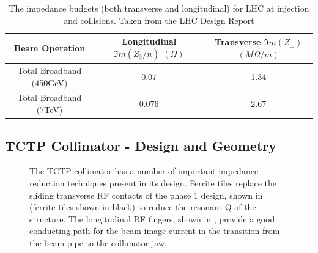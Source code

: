 \begin{table}
\caption{The impedance budgets (both transverse and longitudinal) for LHC at injection and collisions. Taken from the LHC Design Report \cite{Ruggiero:LHCColEff}}
\begin{center}
\begin{tabular}{c | c | c}
Beam Operation & Longitudinal $\Im{}m ( Z_{\parallel}/n )$ $( \Omega )$ & Transverse $\Im{}m ( Z_{\perp} )$ $(M \Omega /m )$\\ \hline
Total Broadband (450GeV) & 0.07 & 1.34 \\ \hline
Total Broadband (7TeV) & 0.076 & 2.67 \\ \hline
\end{tabular}
\end{center}
\label{tab:lhc-impedance-budget}
\end{table}

\subsection{TCTP Collimator - Design and Geometry}

\begin{figure}
\caption{The TCTP collimator has a number of important impedance reduction techniques present in its design. Ferrite tiles replace the sliding transverse RF contacts of the phase 1 design, shown in  (ferrite tiles shown in black) to reduce the resonant Q of the structure. The longitudinal RF fingers, shown in , provide a good conducting path for the beam image current in the transition from the beam pipe to the collimator jaw.}
\label{fig:tctp-figure}
\end{figure}

